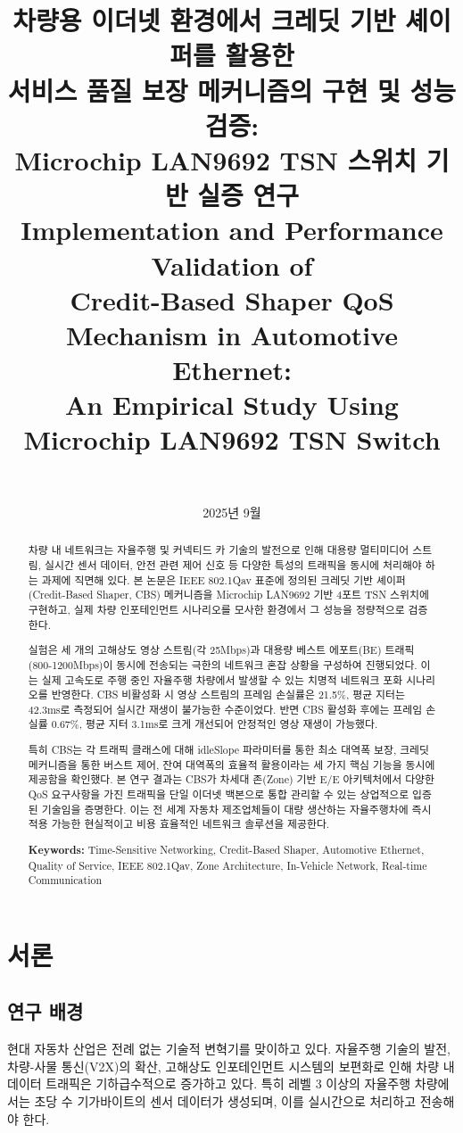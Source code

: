 \documentclass[10pt,twocolumn]{IEEEtran}
\title{차량용 이더넷 환경에서 크레딧 기반 셰이퍼를 활용한\\
서비스 품질 보장 메커니즘의 구현 및 성능 검증:\\
Microchip LAN9692 TSN 스위치 기반 실증 연구\\
\vspace{0.5cm}
\large Implementation and Performance Validation of\\
Credit-Based Shaper QoS Mechanism in Automotive Ethernet:\\
An Empirical Study Using Microchip LAN9692 TSN Switch}
\author{
\IEEEauthorblockN{김현우$^{1}$, 송현수$^{1}$, 안종화$^{1}$, 박부식$^{1}$}\\
\IEEEauthorblockA{$^{1}$TSN팀, 차량전자연구부\\
한국전자기술연구원\\
Email: \{hwkim, shsong, jhahn, bspark\}@keti.re.kr}
}
\date{2025년 9월}
\begin{document}
\maketitle

\begin{abstract}
차량 내 네트워크는 자율주행 및 커넥티드 카 기술의 발전으로 인해 대용량 멀티미디어 스트림, 실시간 센서 데이터, 안전 관련 제어 신호 등 다양한 특성의 트래픽을 동시에 처리해야 하는 과제에 직면해 있다. 본 논문은 IEEE 802.1Qav 표준에 정의된 크레딧 기반 셰이퍼(Credit-Based Shaper, CBS) 메커니즘을 Microchip LAN9692 기반 4포트 TSN 스위치에 구현하고, 실제 차량 인포테인먼트 시나리오를 모사한 환경에서 그 성능을 정량적으로 검증한다. 

실험은 세 개의 고해상도 영상 스트림(각 25Mbps)과 대용량 베스트 에포트(BE) 트래픽(800-1200Mbps)이 동시에 전송되는 극한의 네트워크 혼잡 상황을 구성하여 진행되었다. 이는 실제 고속도로 주행 중인 자율주행 차량에서 발생할 수 있는 치명적 네트워크 포화 시나리오를 반영한다. CBS 비활성화 시 영상 스트림의 프레임 손실률은 21.5\%, 평균 지터는 42.3ms로 측정되어 실시간 재생이 불가능한 수준이었다. 반면 CBS 활성화 후에는 프레임 손실률 0.67\%, 평균 지터 3.1ms로 크게 개선되어 안정적인 영상 재생이 가능했다. 

특히 CBS는 각 트래픽 클래스에 대해 idleSlope 파라미터를 통한 최소 대역폭 보장, 크레딧 메커니즘을 통한 버스트 제어, 잔여 대역폭의 효율적 활용이라는 세 가지 핵심 기능을 동시에 제공함을 확인했다. 본 연구 결과는 CBS가 차세대 존(Zone) 기반 E/E 아키텍처에서 다양한 QoS 요구사항을 가진 트래픽을 단일 이더넷 백본으로 통합 관리할 수 있는 상업적으로 입증된 기술임을 증명한다. 이는 전 세계 자동차 제조업체들이 대량 생산하는 자율주행차에 즉시 적용 가능한 현실적이고 비용 효율적인 네트워크 솔루션을 제공한다.

\textbf{Keywords:} Time-Sensitive Networking, Credit-Based Shaper, Automotive Ethernet, Quality of Service, IEEE 802.1Qav, Zone Architecture, In-Vehicle Network, Real-time Communication
\end{abstract}

\section{서론}

\subsection{연구 배경}

현대 자동차 산업은 전례 없는 기술적 변혁기를 맞이하고 있다. 자율주행 기술의 발전, 차량-사물 통신(V2X)의 확산, 고해상도 인포테인먼트 시스템의 보편화로 인해 차량 내 데이터 트래픽은 기하급수적으로 증가하고 있다\cite{autonomous2024}. 특히 레벨 3 이상의 자율주행 차량에서는 초당 수 기가바이트의 센서 데이터가 생성되며, 이를 실시간으로 처리하고 전송해야 한다\cite{sensor_fusion2023}.
\end{document}
